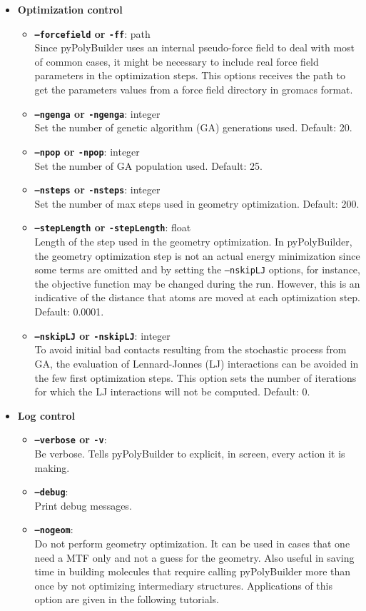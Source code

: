 \documentclass[12pt]{article}
\begin{document}
\begin{itemize}
  \item \textbf{Optimization control}
\begin{itemize}
  \item \textbf{\texttt{--forcefield} or \texttt{-ff}}: path\\
    Since pyPolyBuilder uses an internal pseudo-force field to deal with most of common cases, it might be necessary to include real force field parameters in the optimization steps. This options receives the path to get the parameters values from a force field directory in gromacs format.
  \item \textbf{\texttt{--ngenga} or \texttt{-ngenga}}: integer\\
    Set the number of genetic algorithm (GA) generations used. Default: 20.
  \item \textbf{\texttt{--npop} or \texttt{-npop}}: integer\\
    Set the number of GA population used. Default: 25.
  \item \textbf{\texttt{--nsteps} or \texttt{-nsteps}}: integer\\
    Set the number of max steps used in geometry optimization. Default: 200.
  \item \textbf{\texttt{--stepLength} or \texttt{-stepLength}}: float\\
    Length of the step used in the geometry optimization. In pyPolyBuilder, the geometry optimization step is not an actual energy minimization since some terms are omitted and by setting the \texttt{--nskipLJ} options, for instance, the objective function may be changed during the run. However, this is an indicative of the distance that atoms are moved at each optimization step. Default: 0.0001.
  \item \textbf{\texttt{--nskipLJ} or \texttt{-nskipLJ}}: integer\\
    To avoid initial bad contacts resulting from the stochastic process from GA, the evaluation of Lennard-Jonnes (LJ) interactions can be avoided in the few first optimization steps. This option sets the number of iterations for which the LJ interactions will not be computed. Default: 0.
\end{itemize}

  \item \textbf{Log control}
\begin{itemize}
  \item \textbf{\texttt{--verbose} or \texttt{-v}}:\\
    Be verbose. Tells pyPolyBuilder to explicit, in screen, every action it is making.
  \item \textbf{\texttt{--debug}}:\\
    Print debug messages.
  \item \textbf{\texttt{--nogeom}}:\\
    Do not perform geometry optimization. It can be used in cases that one need a MTF only and not a guess for the geometry. Also useful in saving time in building molecules that require calling pyPolyBuilder more than once by not optimizing intermediary structures. Applications of this option are given in the following tutorials.
\end{itemize}


\end{itemize}
\end{document}
